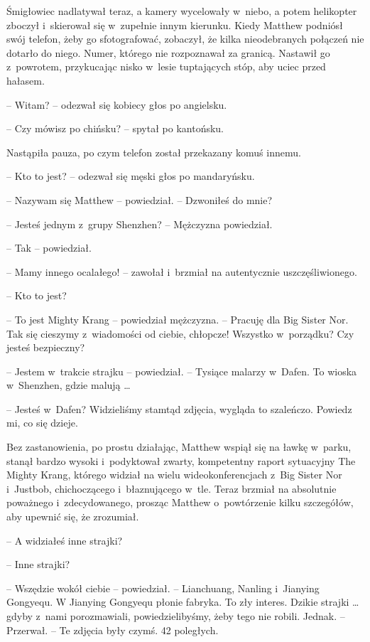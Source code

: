 \documentclass[oneside,polish,11pt,rmheadings]{mwbk}
\begin{document}
Śmigłowiec nadlatywał teraz, a kamery wycelowały w~niebo, a potem helikopter zboczył i~skierował się w~zupełnie innym kierunku. Kiedy Matthew podniósł swój telefon, żeby go sfotografować, zobaczył, że kilka nieodebranych połączeń nie dotarło do niego. Numer, którego nie rozpoznawał za granicą. Nastawił go z~powrotem, przykucając nisko w~lesie tuptających stóp, aby uciec przed hałasem.

-- Witam? -- odezwał się kobiecy głos po angielsku.

-- Czy mówisz po chińsku? -- spytał po kantońsku.

Nastąpiła pauza, po czym telefon został przekazany komuś innemu.

-- Kto to jest? -- odezwał się męski głos po mandaryńsku.

-- Nazywam się Matthew -- powiedział. -- Dzwoniłeś do mnie? 

-- Jesteś jednym z~grupy Shenzhen? -- Mężczyzna powiedział.

-- Tak -- powiedział.

-- Mamy innego ocalałego! -- zawołał i~brzmiał na autentycznie uszczęśliwionego.

-- Kto to jest? 

-- To jest Mighty Krang -- powiedział mężczyzna. -- Pracuję dla Big Sister Nor. Tak się cieszymy z~wiadomości od ciebie, chłopcze! Wszystko w~porządku? Czy jesteś bezpieczny?

-- Jestem w~trakcie strajku -- powiedział. -- Tysiące malarzy w~Dafen. To wioska w~Shenzhen, gdzie malują \ldots 

-- Jesteś w~Dafen? Widzieliśmy stamtąd zdjęcia, wygląda to szaleńczo. Powiedz mi, co się dzieje. 

Bez zastanowienia, po prostu działając, Matthew wspiął się na ławkę w~parku, stanął bardzo wysoki i~podyktował zwarty, kompetentny raport sytuacyjny The Mighty Krang, którego widział na wielu wideokonferencjach z~Big Sister Nor i~Justbob, chichoczącego i~błaznującego w~tle. Teraz brzmiał na absolutnie poważnego i~zdecydowanego, prosząc Matthew o~powtórzenie kilku szczegółów, aby upewnić się, że zrozumiał.

-- A widziałeś inne strajki?

-- Inne strajki?

-- Wszędzie wokół ciebie -- powiedział. -- Lianchuang, Nanling i~Jianying Gongyequ. W Jianying Gongyequ płonie fabryka. To zły interes. Dzikie strajki \ldots  gdyby z~nami porozmawiali, powiedzielibyśmy, żeby tego nie robili. Jednak. -- Przerwał. -- Te zdjęcia były czymś. 42 poległych.
\end{document}
